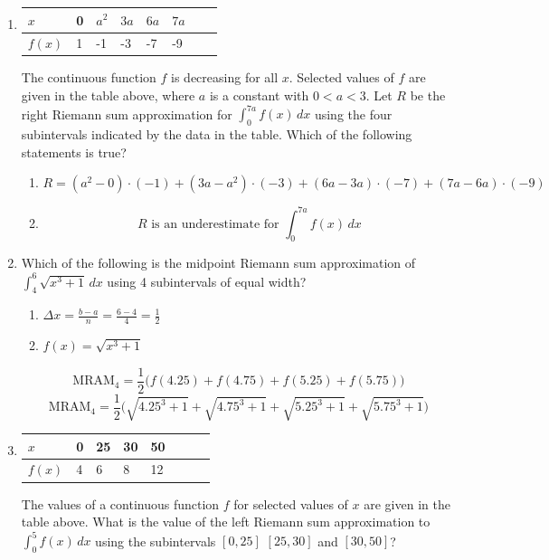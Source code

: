 \documentclass[12pt]{article}
\begin{document}
\begin{enumerate}
\item 

\begin{table}[H]
\centering
\begin{tabular}{|l||l|l|l|l|l|l|l|}
\hline
$x$ & 0 & $a^2$ & $3a$ & $6a$ & $7a$ \\ \hline
$f(x)$ & 1 & -1 & -3 & -7 & -9 \\ \hline
\end{tabular}
\end{table}
The continuous function $f$ is decreasing for all $x$. Selected values of $f$ are given in the table above, where $a$ is a constant with $0<a<3$. Let $R$ be the right Riemann sum approximation for $\int_{0}^{7a} f(x) \, dx$ using the four subintervals indicated by the data in the table. Which of the following statements is true?
\begin{enumerate}
    \item $$\boxed{R=(a^2-0) \cdot (-1) +(3a-a^2) \cdot (-3) +(6a-3a) \cdot(-7) +(7a-6a) \cdot (-9)}$$ 
    \item $$\boxed{\text{$R$ is an underestimate for } \int_{0}^{7a} f(x) \, dx}$$
\end{enumerate}


\item 
Which of the following is the midpoint Riemann sum approximation of $\int_{4}^{6} \sqrt{x^3+1} \, dx$ using 4 subintervals of equal width?
\begin{enumerate}
    \item $\Delta x = \frac{b-a}{n}= \frac{6-4}{4}=\frac{1}{2}$
    \item $f(x)=\sqrt{x^3+1}$
\end{enumerate}
$$\text{MRAM}_4 = \frac{1}{2} \big( f(4.25) + f(4.75)+ f(5.25)+ f(5.75) \big)$$
$$\boxed{\text{MRAM}_4 = \frac{1}{2} \biggr( \sqrt{4.25^3+1} + \sqrt{4.75^3+1} + \sqrt{5.25^3+1} + \sqrt{5.75^3+1} \biggr)}$$
\newpage
\item 
\begin{table}[H]
\centering
\begin{tabular}{|l||l|l|l|l|l|l|l|}
\hline
$x$ & 0 & 25 & 30 & 50 \\ \hline
$f(x)$ & 4 & 6 & 8 & 12 \\ \hline
\end{tabular}
\end{table}
The values of a continuous function $f$ for selected values of $x$ are given in the table above. What is the value of the left Riemann sum approximation to $\int_{0}^{5} f(x) \,dx$ using the subintervals $[0, 25]$ $[25, 30]$ and $[30, 50]$?


\end{enumerate}
\end{document}
